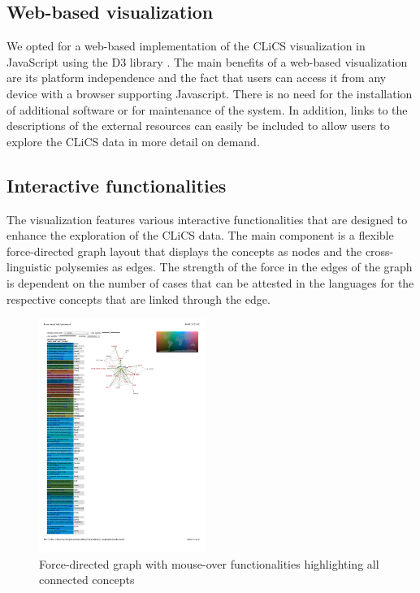 \subsection{Web-based visualization}

We opted for a web-based implementation of the CLiCS visualization in JavaScript using the D3 library \cite{D3}. The main benefits of a web-based visualization are its platform independence and the fact that users can access it from any device with a browser supporting Javascript. There is no need for the installation of additional software or for maintenance of the system. In addition, links to the descriptions of the external resources can easily be included to allow users to explore the CLiCS data in more detail on demand. 

\subsection{Interactive functionalities}



The visualization features various interactive functionalities that are designed to enhance the exploration of the CLiCS data. The main component is a flexible force-directed graph layout that displays the concepts as nodes and the cross-linguistic polysemies as edges. The strength of the force in the edges of the graph is dependent on the number of cases that can be attested in the languages for the respective concepts that are linked through the edge. 

\begin{figure}[htbp]
\begin{center}
\includegraphics[width=0.48\textwidth]{img/countryconnections}
\caption{Force-directed graph with mouse-over functionalities highlighting all connected concepts}
\label{MoneySilver}
\end{center}
\end{figure}

